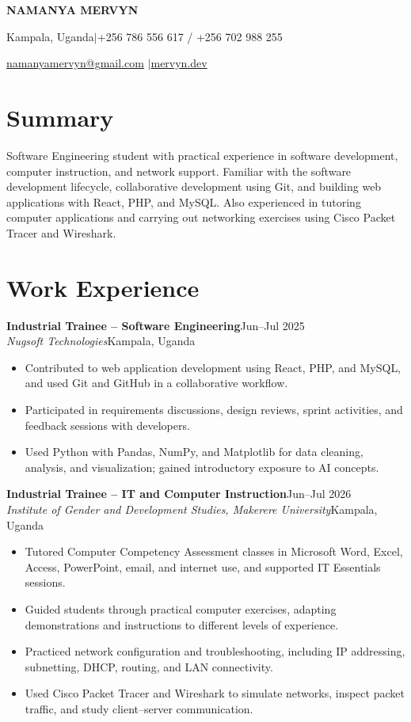 \documentclass[10pt,a4paper]{article}
\newcommand{\experience}[4]{%
  \textbf{#1}\hfill{\small\color{muted}#2}\\[-1pt]
  \textit{#3}\hfill{\small\color{muted}#4}\par
}
\begin{document}
{\centering
  {\LARGE\bfseries\color{accent} NAMANYA MERVYN}\par
  \vspace{4pt}
  Kampala, Uganda\quad $\vert$\quad +256 786 556 617 / +256 702 988 255\par
  \href{mailto:namanyamervyn@gmail.com}{namanyamervyn@gmail.com}
  \quad $\vert$\quad \href{https://mervyn.dev}{mervyn.dev}\par
}

\section{Summary}
Software Engineering student with practical experience in software development, computer instruction, and network support. Familiar with the software development lifecycle, collaborative development using Git, and building web applications with React, PHP, and MySQL. Also experienced in tutoring computer applications and carrying out networking exercises using Cisco Packet Tracer and Wireshark.

\section{Work Experience}
\experience{Industrial Trainee -- Software Engineering}{Jun--Jul 2025}{Nugsoft Technologies}{Kampala, Uganda}
\begin{itemize}
  \item Contributed to web application development using React, PHP, and MySQL, and used Git and GitHub in a collaborative workflow.
  \item Participated in requirements discussions, design reviews, sprint activities, and feedback sessions with developers.
  \item Used Python with Pandas, NumPy, and Matplotlib for data cleaning, analysis, and visualization; gained introductory exposure to AI concepts.
\end{itemize}

\vspace{3pt}
\experience{Industrial Trainee -- IT and Computer Instruction}{Jun--Jul 2026}{Institute of Gender and Development Studies, Makerere University}{Kampala, Uganda}
\begin{itemize}
  \item Tutored Computer Competency Assessment classes in Microsoft Word, Excel, Access, PowerPoint, email, and internet use, and supported IT Essentials sessions.
  \item Guided students through practical computer exercises, adapting demonstrations and instructions to different levels of experience.
  \item Practiced network configuration and troubleshooting, including IP addressing, subnetting, DHCP, routing, and LAN connectivity.
  \item Used Cisco Packet Tracer and Wireshark to simulate networks, inspect packet traffic, and study client--server communication.
\end{itemize}
\end{document}
